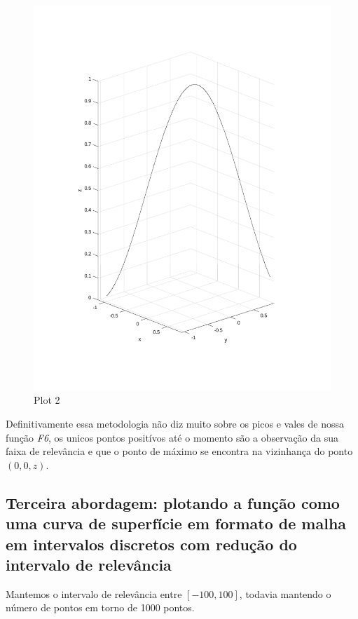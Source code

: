 \documentclass{article}
\begin{document}
\newpage
\begin{figure}[h!]
\centering
\includegraphics[scale=.5]{images/myplot2.pdf}
\caption{Plot 2}
\label{fig:plot2_f6}
\end{figure}

\begin{flushleft}
	Definitivamente essa metodologia não diz muito sobre os picos e
	vales de nossa função \emph{F6}, os unicos pontos positívos até
	o momento são a observação da sua faixa de relevância e que o
	ponto de máximo se encontra na vizinhança do ponto $(0,0,z)$.
\end{flushleft}

\newpage
\subsection*{Terceira abordagem: plotando a função como uma curva de superfície em formato de malha em intervalos discretos com redução do intervalo de relevância}

\begin{flushleft}
	Mantemos o intervalo de relevância entre $[-100,100]$, todavia
	mantendo o número de pontos em torno de 1000 pontos.
\end{flushleft}
\end{document}
